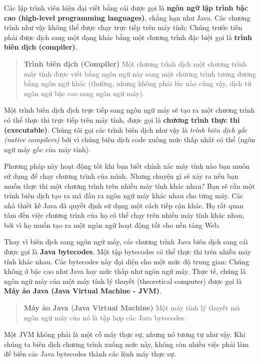 Các lập trình viên hiện đại viết bằng cái được gọi là \textbf{ngôn ngữ
lập trình bậc cao (high-level programming languages)}, chẳng hạn như
Java. Các chương trình như vậy không thể được chạy trực tiếp trên máy
tính: Chúng trước tiên phải được dịch sang một dạng khác bằng một chương
trình đặc biệt gọi là \textbf{trình biên dịch (compiler)}.

\begin{quote}
\textbf{Trình biên dịch (Compiler)} Một chương trình dịch một chương
trình máy tính được viết bằng ngôn ngữ này sang một chương trình tương
đương bằng ngôn ngữ khác (thường, nhưng không phải lúc nào cũng vậy,
dịch từ ngôn ngữ bậc cao sang ngôn ngữ máy).
\end{quote}

Một trình biên dịch dịch trực tiếp sang ngôn ngữ máy sẽ tạo ra một
chương trình có thể thực thi trực tiếp trên máy tính, được gọi là
\textbf{chương trình thực thi (executable)}. Chúng tôi gọi các trình
biên dịch như vậy là \emph{trình biên dịch gốc (native compilers)} bởi
vì chúng biên dịch code xuống mức thấp nhất có thể (ngôn ngữ máy gốc của
máy tính).

Phương pháp này hoạt động tốt khi bạn biết chính xác máy tính nào bạn
muốn sử dụng để chạy chương trình của mình. Nhưng chuyện gì sẽ xảy ra
nếu bạn muốn thực thi một chương trình trên nhiều máy tính khác nhau?
Bạn sẽ cần một trình biên dịch tạo ra mã đầu ra ngôn ngữ máy khác nhau
cho từng máy. Các nhà thiết kế Java đã quyết định sử dụng một cách tiếp
cận khác. Họ rất quan tâm đến việc chương trình của họ có thể chạy trên
nhiều máy tính khác nhau, bởi vì họ muốn tạo ra một ngôn ngữ hoạt động
tốt cho nền tảng Web.

Thay vì biên dịch sang ngôn ngữ máy, các chương trình Java biên dịch
sang cái được gọi là \textbf{Java bytecodes}. Một tập bytecodes có thể
thực thi trên nhiều máy tính khác nhau. Các bytecodes này đại diện cho
một mức độ trung gian: Chúng không ở bậc cao như Java hay mức thấp như
ngôn ngữ máy. Thực tế, chúng là ngôn ngữ máy của một máy tính lý thuyết
(theoretical computer) được gọi là \textbf{Máy ảo Java (Java Virtual
Machine - JVM)}.

\begin{quote}
\textbf{Máy ảo Java (Java Virtual Machine)} Một máy tính lý thuyết mà
ngôn ngữ máy của nó là tập hợp các Java bytecodes.
\end{quote}

Một JVM không phải là một cỗ máy thực sự, nhưng nó tương tự như vậy. Khi
chúng ta biên dịch chương trình xuống mức này, không còn nhiều việc phải
làm để biến các Java bytecodes thành các lệnh máy thực sự.

